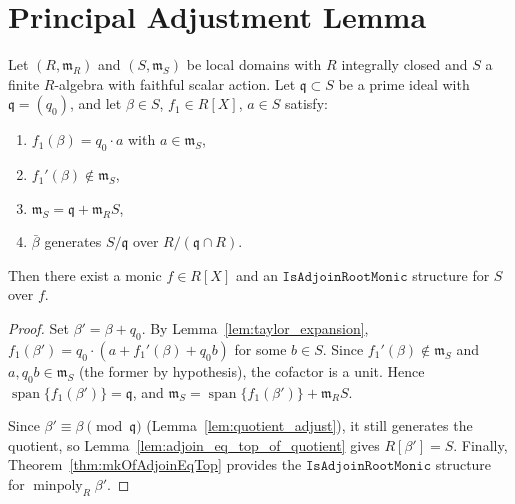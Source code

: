 \section{Principal Adjustment Lemma}

\begin{lemma}
  \label{lem:exists_isAdjoinRootMonic_of_principal_adjust}
  \leanok
  Let $(R, \mathfrak{m}_R)$ and $(S, \mathfrak{m}_S)$ be local domains with
  $R$ integrally closed and $S$ a finite $R$-algebra with faithful scalar action.
  Let $\mathfrak{q} \subset S$ be a prime ideal with $\mathfrak{q} = (q_0)$,
  and let $\beta \in S$, $f_1 \in R[X]$, $a \in S$ satisfy:
  \begin{enumerate}
    \item $f_1(\beta) = q_0 \cdot a$ with $a \in \mathfrak{m}_S$,
    \item $f_1'(\beta) \notin \mathfrak{m}_S$,
    \item $\mathfrak{m}_S = \mathfrak{q} + \mathfrak{m}_R S$,
    \item $\bar\beta$ generates $S/\mathfrak{q}$ over $R/(\mathfrak{q} \cap R)$.
  \end{enumerate}
  Then there exist a monic $f \in R[X]$ and an $\mathtt{IsAdjoinRootMonic}$ structure
  for $S$ over $f$.
\end{lemma}

\begin{proof}
  \leanok
  Set $\beta' = \beta + q_0$.
  By Lemma~\ref{lem:taylor_expansion},
  $f_1(\beta') = q_0 \cdot (a + f_1'(\beta) + q_0 b)$ for some $b \in S$.
  Since $f_1'(\beta) \notin \mathfrak{m}_S$
  and $a, q_0 b \in \mathfrak{m}_S$ (the former by hypothesis), the cofactor is a unit.
  Hence $\operatorname{span}\{f_1(\beta')\} = \mathfrak{q}$, and
  $\mathfrak{m}_S = \operatorname{span}\{f_1(\beta')\} + \mathfrak{m}_R S$.

  Since $\beta' \equiv \beta \pmod{\mathfrak{q}}$ (Lemma~\ref{lem:quotient_adjust}),
  it still generates the quotient, so Lemma~\ref{lem:adjoin_eq_top_of_quotient}
  gives $R[\beta'] = S$.
  Finally, Theorem~\ref{thm:mkOfAdjoinEqTop} provides the
  $\mathtt{IsAdjoinRootMonic}$ structure for $\operatorname{minpoly}_R \beta'$.
\end{proof}

